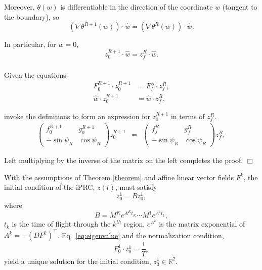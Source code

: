\documentclass{beamer}
\renewcommand{\matrix}[2]{ \left(\begin{array}{#1} #2 \end{array}\right)}
\begin{document}
\begin{frame}
\frametitle{\insertsection}
\framesubtitle{\insertsubsection}
Moreover, $\theta(w)$ is differentiable in the direction of the coordinate $w$ (tangent to the boundary), so
\begin{equation}
\left(\nabla\theta^{R+1}(w)\right)\cdot\hat{w}=\left(\nabla\theta^R(w)\right)\cdot\hat{w}.
\end{equation}

In particular, for $w = 0$,
\begin{equation}
 z_0^{R+1}\cdot\hat{w}=z_f^{R}\cdot\hat{w}.
\end{equation}
\end{frame}


\begin{frame}
\frametitle{\insertsection}
\framesubtitle{\insertsubsection}
Given the equations 
\begin{equation}
\begin{split}
 F_0^{R+1}\cdot z_0^{R+1}&=F_f^{R}\cdot z_f^{R},\\
 \hat{w}\cdot z_0^{R+1}&=\hat{w}\cdot z_f^{R},
\end{split}
\end{equation}

invoke the definitions to form an expression for $z_0^{R+1}$ in terms of $z_f^{R}$.
\begin{eqnarray}
\matrix{cc}{f_0^{R+1} & g_0^{R+1}\\ -\sin\psi_R & \cos\psi_R}z_0^{R+1}
&=&
\matrix{cc}{f_f^R & g_f^R\\ -\sin\psi_R & \cos\psi_R}z_f^R,
\end{eqnarray}

Left multiplying by the inverse of the matrix on the left completes the proof. $\Box$
\end{frame}

\begin{frame}
\begin{corollary}
With the assumptions of Theorem \ref{theorem} and affine linear vector fields $F^k$, the initial condition of the iPRC, $z(t)$, must satisfy
 \begin{equation}\label{eq:eigenvalue}
z^1_0=B z^1_0,
\end{equation}
where
\begin{equation}
B=M^{K}e^{A^{K}t_K}\cdots M^1e^{A^1 t_1},
\end{equation}
$t_k$ is the time of flight through the $k^{th}$ region, $e^{A^{k}}$ is the matrix exponential of $A^k = -\left(DF^k\right)^\intercal$.  Eq.~\eqref{eq:eigenvalue} and the normalization condition,
 \begin{equation}\label{eq:normalization}
F_0^1\cdot z^1_0=\frac{1}{T},
\end{equation}
yield a unique solution for the initial condition, $z_0^1 \in \mathbb{R}^2$.
\label{corl:circuit}\end{corollary}
\end{frame}
\end{document}

